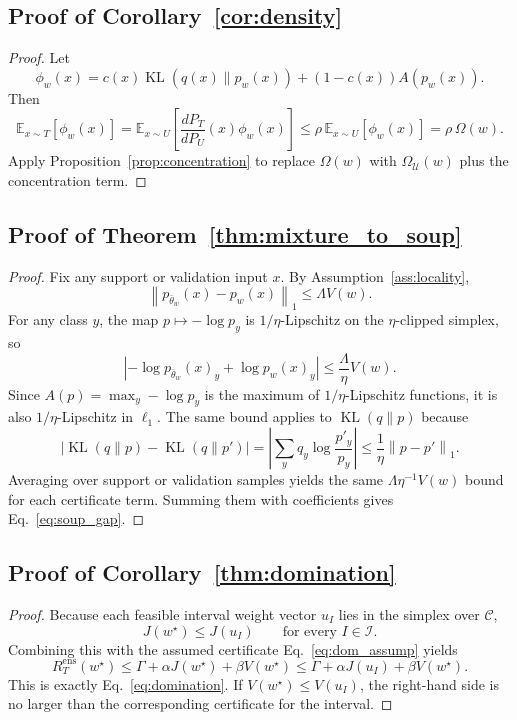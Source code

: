 \documentclass{article}
\newcommand{\EE}{\mathbb{E}}
\newcommand{\cC}{\mathcal{C}}
\newcommand{\cU}{\mathcal{U}}
\newcommand{\cI}{\mathcal{I}}
\newcommand{\KL}{\operatorname{KL}}
\newcommand{\norm}[1]{\left\lVert #1 \right\rVert}
\begin{document}
\subsection{Proof of Corollary~\ref{cor:density}}

\begin{proof}
Let
\[
    \phi_w(x)
    =
    c(x)\KL(q(x)\|p_w(x))
    +
    (1-c(x))A(p_w(x)).
\]
Then
\[
    \EE_{x\sim T}[\phi_w(x)]
    =
    \EE_{x\sim U}\!\left[\frac{dP_T}{dP_U}(x)\phi_w(x)\right]
    \le
    \rho\, \EE_{x\sim U}[\phi_w(x)]
    =
    \rho\, \Omega(w).
\]
Apply Proposition~\ref{prop:concentration} to replace $\Omega(w)$ with $\Omega_{\cU}(w)$ plus the concentration term.
\end{proof}

\subsection{Proof of Theorem~\ref{thm:mixture_to_soup}}

\begin{proof}
Fix any support or validation input $x$. By Assumption~\ref{ass:locality},
\[
    \norm{p_{\bar\theta_w}(x)-p_w(x)}_1
    \le
    \Lambda V(w).
\]
For any class $y$, the map $p\mapsto -\log p_y$ is $1/\eta$-Lipschitz on the $\eta$-clipped simplex, so
\[
    \left|
        -\log p_{\bar\theta_w}(x)_y
        +
        \log p_w(x)_y
    \right|
    \le
    \frac{\Lambda}{\eta}V(w).
\]
Since $A(p)=\max_y -\log p_y$ is the maximum of $1/\eta$-Lipschitz functions, it is also $1/\eta$-Lipschitz in $\ell_1$. The same bound applies to $\KL(q\|p)$ because
\[
    \left|
        \KL(q\|p)-\KL(q\|p')
    \right|
    =
    \left|
        \sum_y q_y \log \frac{p'_y}{p_y}
    \right|
    \le
    \frac{1}{\eta}\norm{p-p'}_1.
\]
Averaging over support or validation samples yields the same $\Lambda\eta^{-1}V(w)$ bound for each certificate term. Summing them with coefficients gives Eq.~\eqref{eq:soup_gap}.
\end{proof}

\subsection{Proof of Corollary~\ref{thm:domination}}

\begin{proof}
Because each feasible interval weight vector $u_I$ lies in the simplex over $\cC$,
\[
    J(w^\star) \le J(u_I)
    \qquad
    \text{for every } I\in\cI.
\]
Combining this with the assumed certificate Eq.~\eqref{eq:dom_assump} yields
\[
    R_T^{\mathrm{ens}}(w^\star)
    \le
    \Gamma + \alpha J(w^\star) + \beta V(w^\star)
    \le
    \Gamma + \alpha J(u_I) + \beta V(w^\star).
\]
This is exactly Eq.~\eqref{eq:domination}. If $V(w^\star)\le V(u_I)$, the right-hand side is no larger than the corresponding certificate for the interval.
\end{proof}
\end{document}
